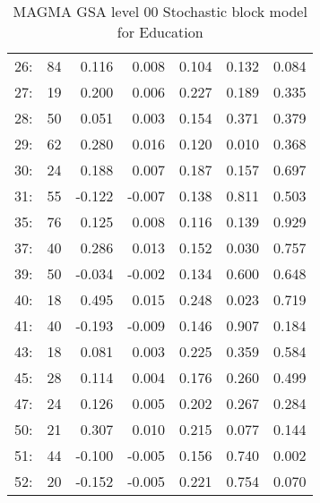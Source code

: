 \begin{table}[ht]
\begin{tabular}{lrrrrrr}
  26: &   84 & 0.116 & 0.008 & 0.104 & 0.132 & 0.084 \\ 
  27: &   19 & 0.200 & 0.006 & 0.227 & 0.189 & 0.335 \\ 
  28: &   50 & 0.051 & 0.003 & 0.154 & 0.371 & 0.379 \\ 
  29: &   62 & 0.280 & 0.016 & 0.120 & 0.010 & 0.368 \\ 
  30: &   24 & 0.188 & 0.007 & 0.187 & 0.157 & 0.697 \\ 
  31: &   55 & -0.122 & -0.007 & 0.138 & 0.811 & 0.503 \\ 
  35: &   76 & 0.125 & 0.008 & 0.116 & 0.139 & 0.929 \\ 
  37: &   40 & 0.286 & 0.013 & 0.152 & 0.030 & 0.757 \\ 
  39: &   50 & -0.034 & -0.002 & 0.134 & 0.600 & 0.648 \\ 
  40: &   18 & 0.495 & 0.015 & 0.248 & 0.023 & 0.719 \\ 
  41: &   40 & -0.193 & -0.009 & 0.146 & 0.907 & 0.184 \\ 
  43: &   18 & 0.081 & 0.003 & 0.225 & 0.359 & 0.584 \\ 
  45: &   28 & 0.114 & 0.004 & 0.176 & 0.260 & 0.499 \\ 
  47: &   24 & 0.126 & 0.005 & 0.202 & 0.267 & 0.284 \\ 
  50: &   21 & 0.307 & 0.010 & 0.215 & 0.077 & 0.144 \\ 
  51: &   44 & -0.100 & -0.005 & 0.156 & 0.740 & 0.002 \\ 
  52: &   20 & -0.152 & -0.005 & 0.221 & 0.754 & 0.070 \\ 
   \hline
\end{tabular}
\caption{MAGMA GSA level 00 Stochastic block model for Education } 
\label{Table:SBM_education}
\end{table}

